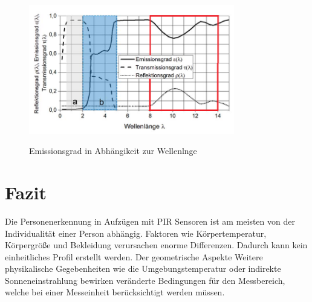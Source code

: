 \begin{figure}[H]
	\centering
	\includegraphics[width=0.8\textwidth]
	{fig/Glas_bearbeitet.png}
	\caption[Emissionsgrad in Abhängikeit zur Wellenlnge]{Emissionsgrad in Abhängikeit zur Wellenlnge} \protect\cite{Edelstahl}
	\label{fig:Glas}	
\end{figure}

\section{Fazit}

Die Personenerkennung in Aufzügen mit \ac{PIR} Sensoren ist am meisten von der Individualität einer Person abhängig. Faktoren wie Körpertemperatur, Körpergröße und Bekleidung verursachen enorme Differenzen. Dadurch kann kein einheitliches Profil erstellt werden. Der geometrische Aspekte Weitere physikalische Gegebenheiten wie die Umgebungstemperatur oder indirekte Sonneneinstrahlung bewirken veränderte Bedingungen für den Messbereich, welche bei einer Messeinheit berücksichtigt werden müssen.     


